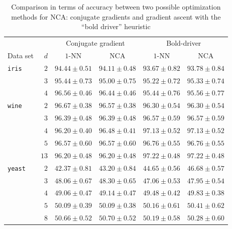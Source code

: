\begin{landscape}
  \begin{table}
  \centering
    \begin{tabular}{lrcccc}
    \toprule
	    &     & \multicolumn{2}{c}{Conjugate gradient}  & \multicolumn{2}{c}{Bold-driver}\\
    \cmidrule(r){3-4} \cmidrule(r){5-6}
    Data set & $d$ & $1$-NN & NCA & $1$-NN & NCA \\
    \midrule
      \texttt{iris}&$2$&$94.44 \pm 0.51$&$94.11 \pm 0.48$&$93.67 \pm 0.82$&$93.78 \pm 0.84$\\ 
      &$3$&$95.44 \pm 0.73$&$95.00 \pm 0.75$&$95.22 \pm 0.72$&$95.33 \pm 0.74$\\ 
      &$4$&$96.56 \pm 0.46$&$96.44 \pm 0.46$&$95.44 \pm 0.76$&$95.56 \pm 0.77$\\ 
      \midrule
      \texttt{wine}&$2$&$96.67 \pm 0.38$&$96.57 \pm 0.38$&$96.30 \pm 0.54$&$96.30 \pm 0.54$\\ 
      &$3$&$96.39 \pm 0.48$&$96.39 \pm 0.48$&$96.57 \pm 0.59$&$96.57 \pm 0.59$\\ 
      &$4$&$96.20 \pm 0.40$&$96.48 \pm 0.41$&$97.13 \pm 0.52$&$97.13 \pm 0.52$\\ 
      &$5$&$96.57 \pm 0.60$&$96.57 \pm 0.60$&$96.76 \pm 0.55$&$96.76 \pm 0.55$\\ 
      &$13$&$96.20 \pm 0.48$&$96.20 \pm 0.48$&$97.22 \pm 0.48$&$97.22 \pm 0.48$\\ 
      \midrule
      \texttt{yeast}&$2$&$42.37 \pm 0.81$&$43.20 \pm 0.84$&$44.65 \pm 0.56$&$46.68 \pm 0.57$\\ 
      &$3$&$48.06 \pm 0.67$&$48.30 \pm 0.65$&$47.06 \pm 0.53$&$47.95 \pm 0.54$\\ 
      &$4$&$49.06 \pm 0.47$&$49.14 \pm 0.47$&$49.48 \pm 0.42$&$49.83 \pm 0.38$\\ 
      &$5$&$50.09 \pm 0.39$&$50.09 \pm 0.38$&$50.16 \pm 0.61$&$50.41 \pm 0.62$\\ 
      &$8$&$50.66 \pm 0.52$&$50.70 \pm 0.52$&$50.19 \pm 0.58$&$50.28 \pm 0.60$\\ 
    \bottomrule
    \end{tabular}
  \caption{Comparison in terms of accuracy between two possible optimization methods for NCA: conjugate gradients and gradient ascent with the ``bold driver'' heuristic}
  \label{table:comp-opts-2}
  \end{table}
\end{landscape}

